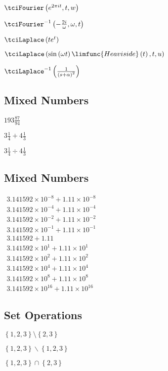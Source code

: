 \documentclass{article}
\begin{document}
$\tciFourier \left( e^{2\pi it},t,w\right) $

$\tciFourier ^{-1}\left( -\frac{2i}{\omega },\omega ,t\right) $

$\tciLaplace \left( te^{t}\right) $

$\tciLaplace \left( \sin \left( \omega t\right) \limfunc{Heaviside}\left(
t\right) ,t,u\right) $

$\tciLaplace ^{-1}\left( \frac{1}{\left( s+\alpha \right) ^{2}}\right) $

\subsection{Mixed Numbers}

$193\frac{87}{94}$

$3\frac{1}{4}+4\frac{1}{3}$

$3\frac{1}{4}\div 4\frac{1}{3}$

\subsection{Mixed Numbers}

$%
\begin{array}{c}
3.141592\times 10^{-8}+1.11\times 10^{-8} \\ 
3.141592\times 10^{-4}+1.11\times 10^{-4} \\ 
3.141592\times 10^{-2}+1.11\times 10^{-2} \\ 
3.141592\times 10^{-1}+1.11\times 10^{-1} \\ 
3.141592+1.11 \\ 
3.141592\times 10^{1}+1.11\times 10^{1} \\ 
3.141592\times 10^{2}+1.11\times 10^{2} \\ 
3.141592\times 10^{4}+1.11\times 10^{4} \\ 
3.141592\times 10^{8}+1.11\times 10^{8} \\ 
3.141592\times 10^{16}+1.11\times 10^{16}%
\end{array}%
$

\subsection{Set Operations}

$\left\{ 1,2,3\right\} \setminus \left\{ 2,3\right\} $

$\left\{ 1,2,3\right\} \backslash \left\{ 1,2,3\right\} $

$\left\{ 1,2,3\right\} \cap \left\{ 2,3\right\} $
\end{document}
